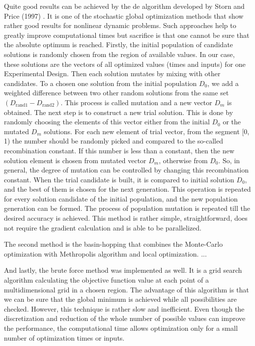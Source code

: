 \documentclass[10pt,A4paper]{article}
\begin{document}
Quite good results can be achieved by the \ac{de} algorithm developed by Storn and Price (1997) \cite{stornDifferentialEvolutionSimple1997}.
It is one of the stochastic global optimization methods that show rather good results for nonlinear dynamic problems.
Such approaches help to greatly improve computational times but sacrifice is that one cannot be sure that the absolute optimum is reached.
Firstly, the initial population of candidate solutions is randomly chosen from the region of available values.
In our case, these solutions are the vectors of all optimized values (times and inputs) for one Experimental Design.
Then each solution mutates by mixing with other candidates.
To a chosen one solution from the initial population $D_0$, we add a weighted difference between two other random solutions from the same set $(D_\text{rand1} - D_\text{rand2})$.
This process is called mutation and a new vector $D_m$ is obtained.
The next step is to construct a new trial solution.
This is done by randomly choosing the elements of this vector either from the initial $D_0$ or the mutated $D_m$ solutions.
For each new element of trial vector, from the segment [0, 1) the number should be randomly picked and compared to the so-called recombination constant.
If this number is less than a constant, then the new solution element is chosen from mutated vector $D_m$, otherwise from $D_0$.
So, in general, the degree of mutation can be controlled by changing this recombination constant.
When the trial candidate is built, it is compared to initial solution $D_0$, and the best of them is chosen for the next generation.
This operation is repeated for every solution candidate of the initial population, and the new population generation can be formed.
The process of population mutation is repeated till the desired accuracy is achieved.
This method is rather simple, straightforward, does not require the gradient calculation and is able to be parallelized.

The second method is the basin-hopping that combines the Monte-Carlo optimization with Methropolis algorithm and local optimization. ...

And lastly, the brute force method was implemented as well.
It is a grid search algorithm calculating the objective function value at each point of a multidimensional grid in a chosen region.
The advantage of this algorithm is that we can be sure that the global minimum is achieved while all possibilities are checked. 
However, this technique is rather slow and inefficient.
Even though the discretization and reduction of the whole number of possible values can improve the performance, the computational time allows optimization only for a small number of optimization times or inputs.
\end{document}
